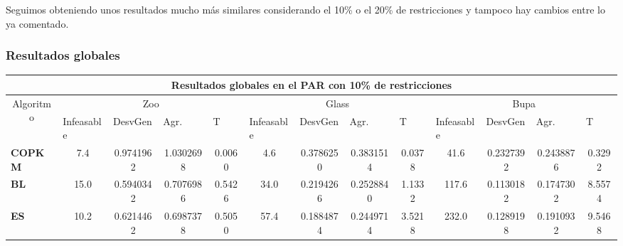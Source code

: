 Seguimos obteniendo unos resultados mucho más similares considerando el 10\% o el 20\% de restricciones y tampoco hay cambios entre lo ya comentado.




\subsubsection{Resultados globales}

\begin{table}[H]
	\tiny

	\begin{adjustwidth}{-1cm}{-1cm}%
	
	\begin{tabular}{|l|c|c|c|c|c|c|c|c|c|c|c|c|}
	\hline
	\multicolumn{13}{|c|}{\textbf{Resultados globales en el PAR con 10\% de restricciones}}                                                                                                                                                                                                                                                                                                                                            \\ \hline
	\multicolumn{1}{|c|}{\multirow{2}{*}{Algoritmo}} & \multicolumn{4}{c|}{Zoo}                                                                                          & \multicolumn{4}{c|}{Glass}                                                                                         & \multicolumn{4}{c|}{Bupa}                                                                                          \\ \cline{2-13} 
	\multicolumn{1}{|c|}{}                                  & \multicolumn{1}{l|}{Infeasable} & \multicolumn{1}{l|}{DesvGen} & \multicolumn{1}{l|}{Agr.} & \multicolumn{1}{l|}{T} & \multicolumn{1}{l|}{Infeasable} & \multicolumn{1}{l|}{DesvGen} & \multicolumn{1}{l|}{Agr.} & \multicolumn{1}{l|}{T} & \multicolumn{1}{l|}{Infeasable} & \multicolumn{1}{l|}{DesvGen} & \multicolumn{1}{l|}{Agr.} & \multicolumn{1}{l|}{T} \\ \hline
	\textbf{COPKM}      & 7.4 & 0.9741962 & 1.0302698 & 0.0060		& 4.6 & 0.3786250 & 0.3831514 & 0.0378     & 41.6 & 0.2327392 & 0.2438876 & 0.3292  \\ \hline
	\textbf{BL}    		& 15.0 & 0.5940342  & 0.7076986 & 0.5426 & 34.0 & 0.2194266 & 0.2528840 & 1.1332 			& 117.6 & 0.1130182 & 0.1747302 & 8.5574		\\ \hline
	\textbf{ES}    		& 10.2 & 	0.6214462&	0.6987378	&0.5050&	57.4 &	0.1884874 &	0.2449714	& 3.5218 & 	232.0	& 0.1289198 & 	0.1910932	& 9.5468		\\ \hline

\end{tabular}
\end{adjustwidth}
\end{table}
